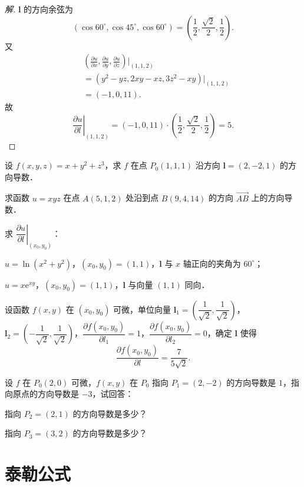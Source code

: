 \begin{proof}[解]
$\bm{l}$ 的方向余弦为
\[
(\cos 60^{\circ},\cos 45^{\circ},\cos 60^{\circ})=\left(\frac{1}{2},\frac{\sqrt{2}}{2},\frac{1}{2}\right).
\]
又
\[
\begin{aligned}
&\left(\frac{\partial u}{\partial x},\frac{\partial u}{\partial y},\frac{\partial u}{\partial z}\right)\bigg|_{(1,1,2)}\\
&=\left(y^{2}-yz,2xy-xz,3z^{2}-xy\right)|_{(1,1,2)}\\
&=(-1,0,11).
\end{aligned}
\]
故
\[
\left.\frac{\partial u}{\partial l}\right|_{(1,1,2)}=(-1,0,11)\cdot\left(\frac{1}{2},\frac{\sqrt{2}}{2},\frac{1}{2}\right)=5.
\]
\end{proof}

\begin{xiti}
\item 设 $f(x,y,z)=x+y^{2}+z^{3}$，求 $f$ 在点 $P_{0}(1,1,1)$ 沿方向 $\bm{l}=(2,-2,1)$ 的方向导数．
\item 求函数 $u=xyz$ 在点 $A(5,1,2)$ 处沿到点 $B(9,4,14)$ 的方向 $\overrightarrow{AB}$ 上的方向导数．
\item 求 $\left.\dfrac{\partial u}{\partial l}\right|_{(x_{0},y_{0})}$：
\begin{ziti}
\item $u=\ln\left(x^{2}+y^{2}\right)$，$(x_{0},y_{0})=(1,1)$，$\bm{l}$ 与 $x$ 轴正向的夹角为 $60^{\circ}$；
\item $u=x\mathrm{e}^{xy}$，$(x_{0},y_{0})=(1,1)$，$\bm{l}$ 与向量 $(1,1)$ 同向．
\end{ziti}
\item 设函数 $f(x,y)$ 在 $(x_{0},y_{0})$ 可微，单位向量 $\bm{l}_{1}=\left(\dfrac{1}{\sqrt{2}},\dfrac{1}{\sqrt{2}}\right)$，$\bm{l}_{2}=\left(-\dfrac{1}{\sqrt{2}},\dfrac{1}{\sqrt{2}}\right)$，$\dfrac{\partial f(x_{0},y_{0})}{\partial l_{1}}=1$，$\dfrac{\partial f(x_{0},y_{0})}{\partial l_{2}}=0$，确定 $\bm{l}$ 使得
\[
\frac{\partial f(x_{0},y_{0})}{\partial l}=\frac{7}{5\sqrt{2}}.
\]
\item 设 $f$ 在 $P_{0}(2,0)$ 可微，$f(x,y)$ 在 $P_{0}$ 指向 $P_{1}=(2,-2)$ 的方向导数是 $1$，指向原点的方向导数是 $-3$，试回答：
\begin{ziti}
\item 指向 $P_{2}=(2,1)$ 的方向导数是多少？
\item 指向 $P_{3}=(3,2)$ 的方向导数是多少？
\end{ziti}
\end{xiti}

\section{泰勒公式}

